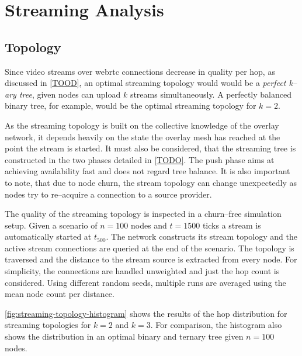 \section{Streaming Analysis}

\subsection{Topology}

Since video streams over \gls{webrtc} connections decrease in quality per hop, as discussed in \vref{TOOD}, an optimal streaming topology would would be a \textit{perfect k–ary tree}, given nodes can upload $k$ streams simultaneously. A perfectly balanced binary tree, for example, would be the optimal streaming topology for $k=2$.

As the streaming topology is built on the collective knowledge of the overlay network, it depends heavily on the state the overlay mesh has reached at the point the stream is started. It must also be considered, that the streaming tree is constructed in the two phases detailed in \vref{TODO}. The push phase aims at achieving availability fast and does not regard tree balance.
It is also important to note, that due to node churn, the stream topology can change unexpectedly as nodes try to re–acquire a connection to a source provider.

The quality of the streaming topology is inspected in a churn–free simulation setup. Given a scenario of $n=100$ nodes and $t=1500$ ticks a stream is automatically started at $t_{500}$. The network constructs its stream topology and the active stream connections are queried at the end of the scenario. The topology is traversed and the distance to the stream source is extracted from every node. For simplicity, the connections are handled unweighted and just the hop count is considered.
Using different random seeds, multiple runs are averaged using the mean node count per distance.

\vref{fig:streaming-topology-histogram} shows the results of the hop distribution for streaming topologies for $k=2$ and $k=3$. For comparison, the histogram also shows the distribution in an optimal binary and ternary tree given $n=100$ nodes.


